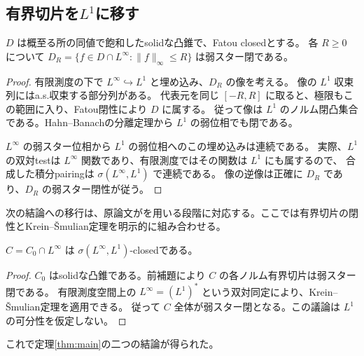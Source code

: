 \subsection{有界切片を\texorpdfstring{$L^1$}{L¹}に移す}
\begin{lemma}
$D$ は概至る所の同値で飽和したsolidな凸錐で、Fatou closedとする。
各 $R\geq0$ について $D_R=\{f\in D\cap L^\infty:\|f\|_\infty\leq R\}$ は弱スター閉である。
\end{lemma}
\begin{proof}
有限測度の下で $L^\infty\hookrightarrow L^1$ と埋め込み、$D_R$ の像を考える。
像の $L^1$ 収束列にはa.s.収束する部分列がある。
代表元を同じ $[-R,R]$ に取ると、極限もこの範囲に入り、Fatou閉性により $D$ に属する。
従って像は $L^1$ のノルム閉凸集合である。Hahn--Banachの分離定理から $L^1$ の弱位相でも閉である。

$L^\infty$ の弱スター位相から $L^1$ の弱位相へのこの埋め込みは連続である。
実際、$L^1$ の双対testは $L^\infty$ 関数であり、有限測度ではその関数は $L^1$ にも属するので、
合成した積分pairingは $\sigma(L^\infty,L^1)$ で連続である。
像の逆像は正確に $D_R$ であり、$D_R$ の弱スター閉性が従う。
\end{proof}

次の結論への移行は、原論文が\cite[Theorem 2.1]{DS}を用いる段階に対応する。ここでは有界切片の閉性とKrein--\v Smulian定理を明示的に組み合わせる。

\begin{proposition}[弱スター閉性]
\label{prop:weakstar}
$C=C_0\cap L^\infty$ は $\sigma(L^\infty,L^1)$-closedである。
\end{proposition}
\begin{proof}
$C_0$ はsolidな凸錐である。前補題により $C$ の各ノルム有界切片は弱スター閉である。
有限測度空間上の $L^\infty=(L^1)^*$ という双対同定により、Krein--\v Smulian定理を適用できる。
従って $C$ 全体が弱スター閉となる。この議論は $L^1$ の可分性を仮定しない。
\end{proof}
これで定理\ref{thm:main}の二つの結論が得られた。

